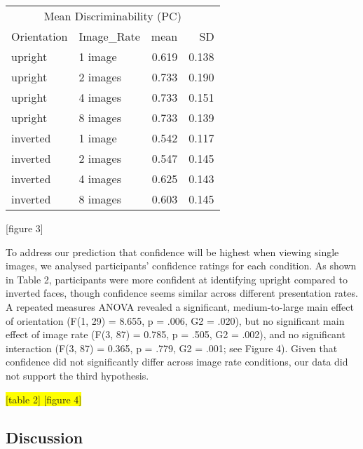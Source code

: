 \documentclass[
  english,
  man]{apa6}
\begin{document}
\begin{tabular}{l|l|r|r}
\hline
\multicolumn{4}{c|}{Mean Discriminability (PC)} \\
\cline{1-4}
Orientation & Image\_Rate & mean & SD\\
\hline
upright & 1 image & 0.619 & 0.138\\
\hline
upright & 2 images & 0.733 & 0.190\\
\hline
upright & 4 images & 0.733 & 0.151\\
\hline
upright & 8 images & 0.733 & 0.139\\
\hline
inverted & 1 image & 0.542 & 0.117\\
\hline
inverted & 2 images & 0.547 & 0.145\\
\hline
inverted & 4 images & 0.625 & 0.143\\
\hline
inverted & 8 images & 0.603 & 0.145\\
\hline
\end{tabular}

{[}figure 3{]}

To address our prediction that confidence will be highest when viewing single images, we analysed participants' confidence ratings for each condition. As shown in Table 2, participants were more confident at identifying upright compared to inverted faces, though confidence seems similar across different presentation rates. A repeated measures ANOVA revealed a significant, medium-to-large main effect of orientation (F(1, 29) = 8.655, p = .006, G2 = .020), but no significant main effect of image rate (F(3, 87) = 0.785, p = .505, G2 = .002), and no significant interaction (F(3, 87) = 0.365, p = .779, G2 = .001; see Figure 4). Given that confidence did not significantly differ across image rate conditions, our data did not support the third hypothesis.

\colorbox{yellow}{[table 2]
[figure 4]}

\hypertarget{discussion}{%
\subsection{Discussion}\label{discussion}}
\end{document}
